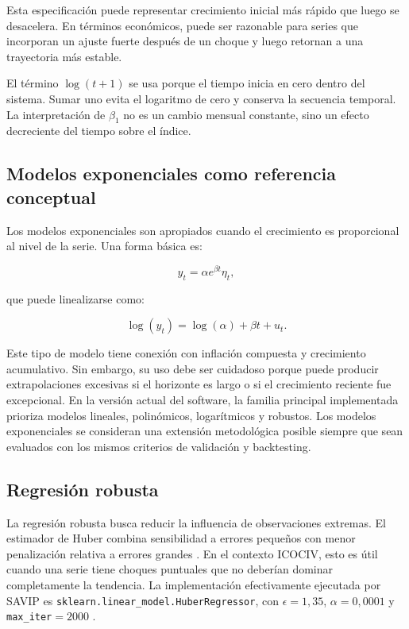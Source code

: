 Esta especificación puede representar crecimiento inicial más rápido que luego se desacelera. En términos económicos, puede ser razonable para series que incorporan un ajuste fuerte después de un choque y luego retornan a una trayectoria más estable.

El término \(\log(t+1)\) se usa porque el tiempo inicia en cero dentro del sistema. Sumar uno evita el logaritmo de cero y conserva la secuencia temporal. La interpretación de \(\beta_1\) no es un cambio mensual constante, sino un efecto decreciente del tiempo sobre el índice.

\subsection{Modelos exponenciales como referencia conceptual}

Los modelos exponenciales son apropiados cuando el crecimiento es proporcional al nivel de la serie. Una forma básica es:

\begin{equation}
    y_t = \alpha e^{\beta t}\eta_t,
    \label{eq:modelo_exponencial}
\end{equation}

que puede linealizarse como:

\begin{equation}
    \log(y_t) = \log(\alpha) + \beta t + u_t.
    \label{eq:modelo_exponencial_log}
\end{equation}

Este tipo de modelo tiene conexión con inflación compuesta y crecimiento acumulativo. Sin embargo, su uso debe ser cuidadoso porque puede producir extrapolaciones excesivas si el horizonte es largo o si el crecimiento reciente fue excepcional. En la versión actual del software, la familia principal implementada prioriza modelos lineales, polinómicos, logarítmicos y robustos. Los modelos exponenciales se consideran una extensión metodológica posible siempre que sean evaluados con los mismos criterios de validación y backtesting.

\subsection{Regresión robusta}

La regresión robusta busca reducir la influencia de observaciones extremas. El estimador de Huber combina sensibilidad a errores pequeños con menor penalización relativa a errores grandes \parencite{huber1964,penn_state_robust_regression}. En el contexto ICOCIV, esto es útil cuando una serie tiene choques puntuales que no deberían dominar completamente la tendencia. La implementación efectivamente ejecutada por SAVIP es \texttt{sklearn.linear\_model.HuberRegressor}, con \(\epsilon=1{,}35\), \(\alpha=0{,}0001\) y \texttt{max\_iter}\(=2000\) \parencite{sklearn_huberregressor}.

